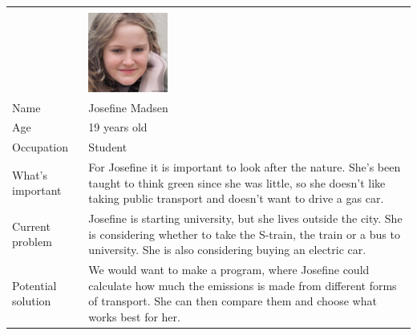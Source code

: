 \begin{tabularx}{\textwidth}{ | l X | }
    \hline
    &                                                         \\
    & \includegraphics[width=0.25\textwidth]{images/josefine} \\
    Name       & Josefine Madsen                                         \\
    Age        & 19 years old                                            \\
    Occupation & Student                                                 \\
    What's important & For Josefine it is important to look after the nature.
    She's been taught to think green since she was little, so she doesn't like taking public transport and doesn't want
    to drive a gas car. \\
    Current problem & Josefine is starting university, but she lives outside the city.
    She is considering whether to take the S-train, the train or a bus to university.
    She is also considering buying an electric car. \\
    Potential solution & We would want to make a program, where Josefine could calculate how much the emissions is made
    from different forms of transport.
    She can then compare them and choose what works best for her. \\
    \hline
\end{tabularx}

